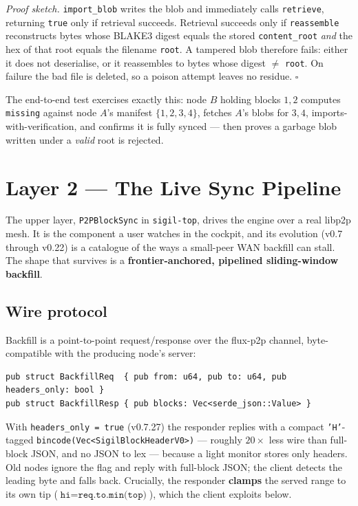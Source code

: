 \documentclass[11pt,a4paper]{article}
\newcommand{\code}[1]{\lstinline[basicstyle=\ttfamily\normalsize\color{codekw}]{#1}}
\begin{document}
\noindent
\emph{Proof sketch.} \code{import_blob} writes the blob and immediately calls
\code{retrieve}, returning \texttt{true} only if retrieval succeeds. Retrieval
succeeds only if \code{reassemble} reconstructs bytes whose BLAKE3 digest equals
the stored \texttt{content\_root} \emph{and} the hex of that root equals the
filename \texttt{root}. A tampered blob therefore fails: either it does not
deserialise, or it reassembles to bytes whose digest $\ne$ \texttt{root}. On
failure the bad file is deleted, so a poison attempt leaves no residue. $\square$

The end-to-end test exercises exactly this: node $B$ holding blocks $1,2$
computes \code{missing} against node $A$'s manifest $\{1,2,3,4\}$, fetches
$A$'s blobs for $3,4$, imports-with-verification, and confirms it is fully synced
--- then proves a garbage blob written under a \emph{valid} root is rejected.

\section{Layer 2 --- The Live Sync Pipeline}
\label{sec:pipeline}

The upper layer, \texttt{P2PBlockSync} in \texttt{sigil-top}, drives the engine
over a real libp2p mesh. It is the component a user watches in the cockpit, and
its evolution (v0.7 through v0.22) is a catalogue of the ways a small-peer WAN
backfill can stall. The shape that survives is a \textbf{frontier-anchored,
pipelined sliding-window backfill}.

\subsection{Wire protocol}

Backfill is a point-to-point request/response over the flux-p2p channel, byte-compatible with the producing node's server:

\begin{lstlisting}
pub struct BackfillReq  { pub from: u64, pub to: u64, pub headers_only: bool }
pub struct BackfillResp { pub blocks: Vec<serde_json::Value> }
\end{lstlisting}

\noindent
With \texttt{headers\_only = true} (v0.7.27) the responder replies with a compact
\texttt{'H'}-tagged \texttt{bincode(Vec<SigilBlockHeaderV0>)} --- roughly
$20\times$ less wire than full-block JSON, and no JSON to lex --- because a light
monitor stores only headers. Old nodes ignore the flag and reply with
full-block JSON; the client detects the leading byte and falls back. Crucially,
the responder \textbf{clamps} the served range to its own tip
($\texttt{hi} = \texttt{req.to.min(top)}$), which the client exploits below.
\end{document}
